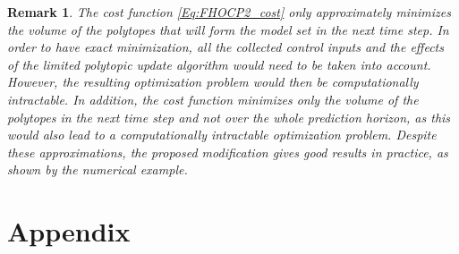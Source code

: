 \documentclass[10 pt, letterpaper]{article}
\newtheorem{remark}{Remark}[section]
\begin{document}
\begin{remark}\label{R:note_on_complexity}
The cost function \eqref{Eq:FHOCP2_cost} only approximately minimizes the volume of the polytopes that will form the model set in the next time step. In order to have exact minimization, all the collected control inputs and the effects of the limited polytopic update algorithm would need to be taken into account. However, the resulting optimization problem would then be computationally intractable. In addition, the cost function minimizes only the volume of the polytopes in the next time step and not over the whole prediction horizon, as this would also lead to a computationally intractable optimization problem. Despite these approximations, the proposed modification gives good results in practice, as shown by the numerical example.
\end{remark}
\section*{Appendix}
\end{document}
